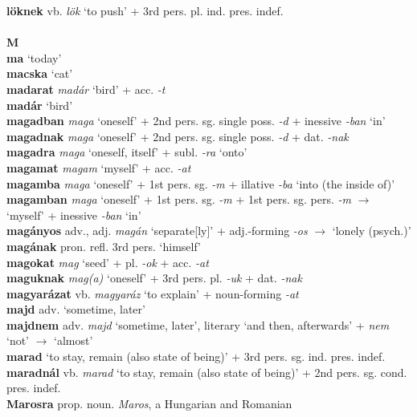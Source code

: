 \documentclass[11pt]{article}
\begin{document}
\textbf{löknek} vb. \emph{lök} `to push' + 3rd pers. pl. ind. pres. indef. \\
\ \\
\noindent \textbf{\large M} \\
\textbf{ma} `today' \\
\textbf{macska} `cat' \\
\textbf{madarat} \emph{madár} `bird' + acc. \emph{-t} \\
\textbf{madár} `bird' \\
\textbf{magadban} \emph{maga} `oneself' + 2nd pers. sg. single
  poss. \emph{-d} + inessive \emph{-ban} `in' \\
\textbf{magadnak} \emph{maga} `oneself' + 2nd pers. sg. single
  poss. \emph{-d} + dat. \emph{-nak} \\
\textbf{magadra} \emph{maga} `oneself, itself' + subl. \emph{-ra}
`onto' \\
\textbf{magamat} \emph{magam} `myself' + acc. \emph{-at} \\
\textbf{magamba} \emph{maga} `oneself' + 1st pers. sg. \emph{-m} +
illative \emph{-ba} `into (the inside of)' \\
\textbf{magamban} \emph{maga} `oneself' + 1st pers. sg. \emph{-m} +
1st pers. sg. pers. \emph{-m} $\rightarrow$ `myself' +
inessive \emph{-ban} `in' \\
\textbf{magányos} adv., adj. \emph{magán} `separate[ly]' +
adj.\hyp{}forming \emph{-os} $\rightarrow$ `lonely (psych.)' \\
\textbf{magának} pron. refl. 3rd pers. `himself' \\
\textbf{magokat} \emph{mag} `seed' + pl. \emph{-ok} +
acc. \emph{-at} \\
\textbf{maguknak} \emph{mag(a)} `oneself' + 3rd pers. pl. \emph{-uk} +
dat. \emph{-nak} \\
\textbf{magyarázat} vb. \emph{magyaráz} `to explain' +
noun\hyp{}forming \emph{-at} \\
\textbf{majd} adv. `sometime, later' \\
\textbf{majdnem} adv. \emph{majd} `sometime, later', literary `and then,
afterwards' + \emph{nem} `not'
$\rightarrow$ `almost' \\
\textbf{marad} `to stay, remain (also state of
being)' + 3rd pers. sg. ind. pres. indef. \\
\textbf{maradnál} vb. \emph{marad} `to stay, remain (also state of
being)' + 2nd pers. sg. cond. pres. indef. \\
\textbf{Marosra} prop. noun. \emph{Maros}, a Hungarian and Romanian
\end{document}
